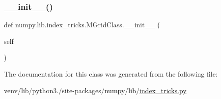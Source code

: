 \subsubsection{\texorpdfstring{\+\_\+\+\_\+init\+\_\+\+\_\+()}{\_\_init\_\_()}}
{\footnotesize\ttfamily def numpy.\+lib.\+index\+\_\+tricks.\+M\+Grid\+Class.\+\_\+\+\_\+init\+\_\+\+\_\+ (\begin{DoxyParamCaption}\item[{}]{self }\end{DoxyParamCaption})}



The documentation for this class was generated from the following file\+:\begin{DoxyCompactItemize}
\item 
venv/lib/python3./site-\/packages/numpy/lib/\hyperlink{lib_2index__tricks_8py}{index\+\_\+tricks.\+py}\end{DoxyCompactItemize}
